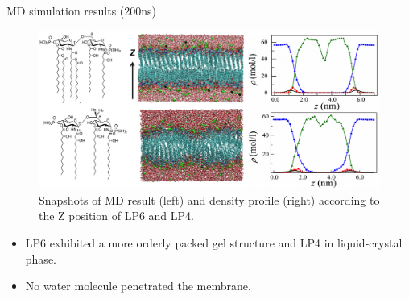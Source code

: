 \documentclass{beamer}
\begin{document}
\begin{frame}{MD simulation results (200ns)}
	\begin{figure}
		\centering
		\includegraphics[width=\linewidth]{Pics/Lipid_dens.png} 
		\caption{Snapshots of MD result (left) and density profile (right) according to the Z position of LP6 and LP4. }
	\end{figure}
	\begin{itemize}
		\item LP6 exhibited a more orderly packed gel structure and LP4 in liquid-crystal phase.
		\item No water molecule penetrated the membrane.  
	\end{itemize}
\end{frame}
\end{document}
